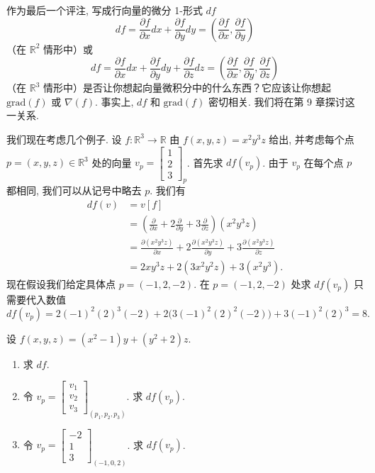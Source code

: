作为最后一个评注, 写成行向量的微分 1-形式 $df$
\[
df=\frac{\partial f}{\partial x}dx+\frac{\partial f}{\partial y}dy=\left(\frac{\partial f}{\partial x},\frac{\partial f}{\partial y}\right)
\]
（在 $\mathbb{R}^2$ 情形中）或
\[
df=\frac{\partial f}{\partial x}dx+\frac{\partial f}{\partial y}dy+\frac{\partial f}{\partial z}dz=\left(\frac{\partial f}{\partial x},\frac{\partial f}{\partial y},\frac{\partial f}{\partial z}\right)
\]
（在 $\mathbb{R}^3$ 情形中）是否让你想起向量微积分中的什么东西？它应该让你想起 $\mathrm{grad}(f)$ 或 $\nabla(f)$. 事实上, $df$ 和 $\mathrm{grad}(f)$ 密切相关. 我们将在第 9 章探讨这一关系.

我们现在考虑几个例子. 设 $f:\mathbb{R}^3\to\mathbb{R}$ 由 $f(x,y,z)=x^2y^3z$ 给出, 并考虑每个点 $p=(x,y,z)\in\mathbb{R}^3$ 处的向量 $v_p=\begin{bmatrix}1\\2\\3\end{bmatrix}_p$. 首先求 $df(v_p)$. 由于 $v_p$ 在每个点 $p$ 都相同, 我们可以从记号中略去 $p$. 我们有
\begin{align*}
df(v)&=v[f]\\
&=\left(\frac{\partial}{\partial x}+2\frac{\partial}{\partial y}+3\frac{\partial}{\partial z}\right)\left(x^2y^3z\right)\\
&=\frac{\partial(x^2y^3z)}{\partial x}+2\frac{\partial(x^2y^3z)}{\partial y}+3\frac{\partial(x^2y^3z)}{\partial z}\\
&=2xy^3z+2(3x^2y^2z)+3(x^2y^3).
\end{align*}
现在假设我们给定具体点 $p=(-1,2,-2)$. 在 $p=(-1,2,-2)$ 处求 $df(v_p)$ 只需要代入数值
\[
df(v_p)=2(-1)^2(2)^3(-2)+2\bigl(3(-1)^2(2)^2(-2)\bigr)+3(-1)^2(2)^3=8.
\]

\begin{question}\label{q:2-15}
设 $f(x,y,z)=(x^2-1)y+(y^2+2)z$.
\begin{enumerate}
  \item[(i)] 求 $df$.
  \item[(ii)] 令 $v_p=\begin{bmatrix}v_1\\v_2\\v_3\end{bmatrix}_{(p_1,p_2,p_3)}$. 求 $df(v_p)$.
  \item[(iii)] 令 $v_p=\begin{bmatrix}-2\\1\\3\end{bmatrix}_{(-1,0,2)}$. 求 $df(v_p)$.
\end{enumerate}
\end{question}

